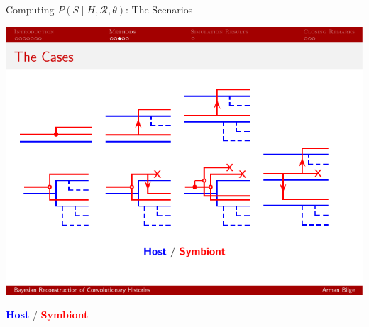 \documentclass{beamer}
\newcommand{\R}{\ensuremath{\mathcal{R}}}
\begin{document}
\begin{frame}{Computing $P\left(S\mid H,\R,\theta\right)$: The Scenarios}

\centering

\includegraphics[width=\textwidth]{figures/scenarios.pdf}

\vspace{0.25in}\textcolor{blue}{\textbf{Host}} / \textcolor{red}{\textbf{Symbiont}}

\end{frame}
\end{document}
